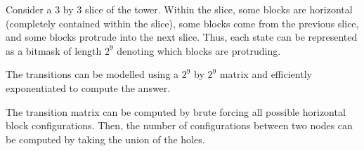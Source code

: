 \documentclass{article}
\begin{document}
Consider a $3$ by $3$ slice of the tower. Within the slice, some blocks are horizontal (completely contained within the slice), some blocks come from the previous slice, and some blocks protrude into the next slice. Thus, each state can be represented as a bitmask of length $2^9$ denoting which blocks are protruding. 

The transitions can be modelled using a $2^9$ by $2^9$ matrix and efficiently exponentiated to compute the answer. 

The transition matrix can be computed by brute forcing all possible horizontal block configurations. Then, the number of configurations between two nodes can be computed by taking the union of the holes. 
\end{document}
